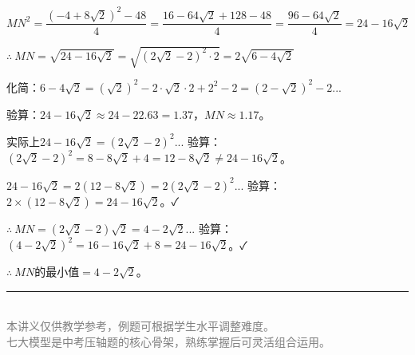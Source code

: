 \documentclass[12pt, a4paper]{ctexart}
\begin{document}
\begin{proofbox}[【题8】详解]
$MN^2 = \dfrac{(-4+8\sqrt{2})^2 - 48}{4} = \dfrac{16 - 64\sqrt{2} + 128 - 48}{4} = \dfrac{96-64\sqrt{2}}{4} = 24 - 16\sqrt{2}$

$\therefore\ MN = \sqrt{24-16\sqrt{2}} = \sqrt{(2\sqrt{2}-2)^2 \cdot 2} = 2\sqrt{6-4\sqrt{2}}$

化简：$6-4\sqrt{2} = (\sqrt{2})^2 - 2\cdot\sqrt{2}\cdot2 + 2^2 - 2 = (2-\sqrt{2})^2 - 2$...

验算：$24-16\sqrt{2} \approx 24-22.63 = 1.37$，$MN \approx 1.17$。

实际上$24-16\sqrt{2} = (2\sqrt{2}-2)^2$... 验算：$(2\sqrt{2}-2)^2 = 8-8\sqrt{2}+4 = 12-8\sqrt{2} \neq 24-16\sqrt{2}$。

$24-16\sqrt{2} = 2(12-8\sqrt{2}) = 2(2\sqrt{2}-2)^2$... 验算：$2 \times (12-8\sqrt{2}) = 24-16\sqrt{2}$。✓

$\therefore\ MN = (2\sqrt{2}-2)\sqrt{2} = 4-2\sqrt{2}$... 验算：$(4-2\sqrt{2})^2 = 16-16\sqrt{2}+8 = 24-16\sqrt{2}$。✓

$\therefore\ MN$的最小值$= \boxed{4-2\sqrt{2}}$。
\end{proofbox}

\vfill
\begin{center}
\textcolor{gray}{\rule{0.5\textwidth}{0.5pt}}\\[6pt]
\small\textcolor{gray}{本讲义仅供教学参考，例题可根据学生水平调整难度。}\\
\small\textcolor{gray}{七大模型是中考压轴题的核心骨架，熟练掌握后可灵活组合运用。}
\end{center}
\end{document}
